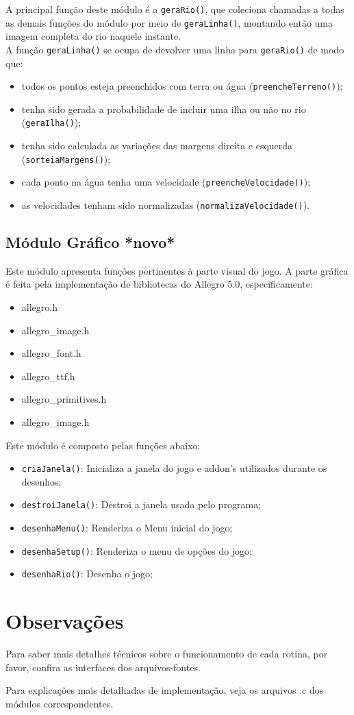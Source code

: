 \documentclass[11pt,a4paper]{article}
\begin{document}
A principal função deste módulo é a \verb|geraRio()|, que coleciona chamadas a todas as demais funções do módulo por meio de \verb|geraLinha()|, montando então uma imagem completa do rio naquele instante. \\

A função \verb|geraLinha()| se ocupa de devolver uma linha para \verb|geraRio()| de modo que:
\begin{itemize}
\item todos os pontos esteja preenchidos com terra ou água (\verb|preencheTerreno()|);
\item tenha sido gerada a probabilidade de incluir uma ilha ou não no rio (\verb|geraIlha()|);
\item tenha sido calculada as variações das margens direita e esquerda \\(\verb|sorteiaMargens()|);
\item cada ponto na água tenha uma velocidade (\verb|preencheVelocidade()|);
\item as velocidades tenham sido normalizadas (\verb|normalizaVelocidade()|).
\end{itemize}

\subsection{Módulo Gráfico *novo*}
Este módulo apresenta funções pertinentes à parte visual do jogo. A parte gráfica é feita pela implementação de bibliotecas do Allegro 5.0, especificamente:
\begin{itemize}
\item allegro.h
\item allegro\_image.h
\item allegro\_font.h
\item allegro\_ttf.h
\item allegro\_primitives.h
\item allegro\_image.h
\end{itemize}

Este módulo é composto pelas funções abaixo:
\begin{itemize}
\item \verb|criaJanela()|: Inicializa a janela do jogo e addon's utilizados durante os desenhos;
\item \verb|destroiJanela()|: Destroi a janela usada pelo programa;
\item \verb|desenhaMenu()|: Renderiza o Menu inicial do jogo;
\item \verb|desenhaSetup()|: Renderiza o menu de opções do jogo;
\item \verb|desenhaRio()|: Desenha o jogo;
\end{itemize}

\section{Observações}
Para saber mais detalhes técnicos sobre o funcionamento de cada rotina, por favor, confira as interfaces dos arquivos-fontes.

Para explicações mais detalhadas de implementação, veja os arquivos .c dos módulos correspondentes.
\end{document}
